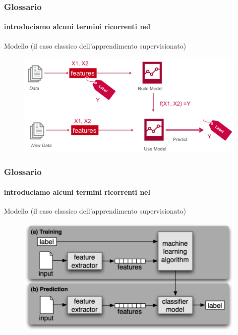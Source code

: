 \begin{frame}

	\frametitle{Glossario}
	\framesubtitle{introduciamo alcuni termini ricorrenti nel \ml}

	\begin{block}{Modello (il caso classico dell'apprendimento supervisionato)}
		\begin{figure}[!htbp]
			\centering
			\includegraphics[width=11.9cm]{images/glossary/supervised_learning_1.png}
			\label{fig:glossary_supervised_learning_1}
		\end{figure}

	\end{block}

\end{frame}


\begin{frame}

	\frametitle{Glossario}
	\framesubtitle{introduciamo alcuni termini ricorrenti nel \ml}

	\begin{block}{Modello (il caso classico dell'apprendimento supervisionato)}
		\begin{figure}[!htbp]
			\centering
			\includegraphics[width=11.2cm]{images/glossary/supervised_learning_2.png}
			\label{fig:glossary_supervised_learning_2}
		\end{figure}

	\end{block}

\end{frame}


